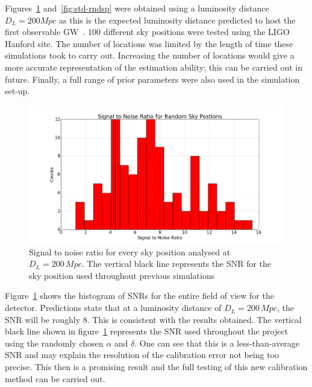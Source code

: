 \documentclass[12pt]{iopart}
\begin{document}
Figures~\ref{fig:snr-rndsp} and~\ref{fig:std-rndsp} were obtained using a
luminosity distance $D_{L} = 200 Mpc$ as this is the expected luminosity
distance predicted to host the first observable GW~\cite{peadvanced}. $100$
different sky positions were tested using the LIGO Hanford site. The number of
locations was limited by the length of time these simulations took to carry
out. Increasing the number of locations would give a more accurate
representation of the estimation ability; this can be carried out in future.
Finally, a full range of prior parameters were also used in the simulation
set-up.

\begin{figure}
  \centering
  \includegraphics[width=\textwidth]{rand_sp_snr_D200}
  \caption{Signal to noise ratio for every sky position analysed at
$D_{L} = 200 \,Mpc$. The vertical black line represents the SNR for the sky
position used throughout previous simulations}
  \label{fig:snr-rndsp}
\end{figure}

Figure~\ref{fig:snr-rndsp} shows the histogram of SNRs for the entire field of
view for the detector. Predictions state that at a luminosity distance of
$D_{L}=200\,Mpc$, the SNR will be roughly 8. This is consistent with the
results obtained. The vertical black line shown in figure~\ref{fig:snr-rndsp}
represents the SNR used throughout the project using the randomly chosen
$\alpha$ and $\delta$. One can see that this is a less-than-average SNR and may
explain the resolution of the calibration error not being too precise. This
then is a promising result and the full testing of this new calibration method
can be carried out.
\end{document}
